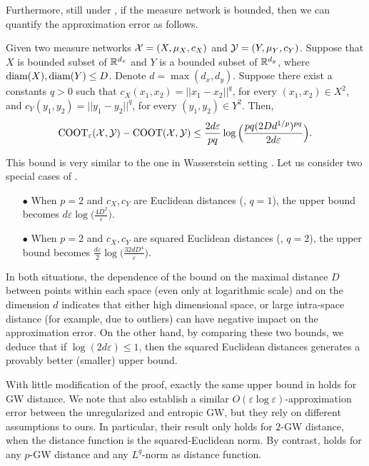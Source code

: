 Furthermore, still under , if the measure network is bounded,
then we can quantify the approximation error as follows.
\begin{proposition} \label{prop:quant_bound_ent}
  Given two measure networks $\mathcal X = (X, \mu_X, c_X)$ and $\mathcal Y = (Y, \mu_Y, c_Y)$.
  Suppose that $X$ is bounded subset of $\mathbb R^{d_x}$ and $Y$ is a bounded subset
  of $\mathbb R^{d_y}$, where $\text{diam}(X), \text{diam}(Y) \leq D$.
  Denote $d = \max(d_x, d_y)$. Suppose there exist a constants $q > 0$ such that
  $c_X(x_1, x_2) = \vert\vert x_1 - x_2 \vert\vert^q$, for every $(x_1,x_2) \in X^2$, and
  $c_Y(y_1, y_2) = \vert\vert y_1 - y_2 \vert\vert^q$, for every $(y_1,y_2) \in Y^2$. Then,
  \begin{equation}
    \text{COOT}_{\varepsilon}(\mathcal X, \mathcal Y) - \text{COOT}(\mathcal X, \mathcal Y) \leq
    \frac{2d \varepsilon}{pq} \log\Big( \frac{pq (2D d^{1/p})^{pq}}{2d \varepsilon} \Big).
  \end{equation}
\end{proposition}
This bound is very similar to the one in Wasserstein setting \citep{Genevay19}.
Let us consider two special cases of .
\begin{itemize}
  \item[$\bullet$] When $p=2$ and $c_X, c_Y$ are Euclidean distances (\ie, $q=1$),
  the upper bound becomes $d\varepsilon \log\Big( \frac{4D^2}{\varepsilon} \Big)$.

  \item[$\bullet$] When $p=2$ and $c_X, c_Y$ are squared Euclidean distances
  (\ie, $q=2$), the upper bound becomes
  $\frac{d\varepsilon}{2} \log\Big( \frac{32dD^4}{\varepsilon} \Big)$.
\end{itemize}
In both situations, the dependence of the bound on the maximal distance $D$ between points
within each space (even only at logarithmic scale) and on the dimension $d$ indicates
that either high dimensional space, or large intra-space distance (for example, due to outliers)
can have negative impact on the approximation error. On the other hand,
by comparing these two bounds, we deduce that if $\log(2d \varepsilon) \leq 1$,
then the squared Euclidean distances generates a provably better (smaller) upper bound.

With little modification of the proof, exactly the same upper bound in 
holds for GW distance. We note that \citep{Zhang23} also establish a similar
$O(\varepsilon \log \varepsilon)$-approximation error between the unregularized and entropic GW,
but they rely on different assumptions to ours. In particular, their result only holds
for $2$-GW distance, when the distance function is the squared-Euclidean norm. By contrast,
 holds for any $p$-GW distance and any $L^q$-norm as distance function.

